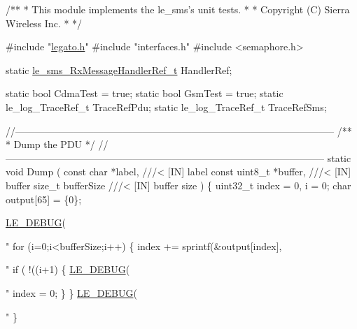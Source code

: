 
\begin{DoxyCodeInclude}
\textcolor{comment}{/**}
\textcolor{comment}{ * This module implements the le\_sms's unit tests.}
\textcolor{comment}{  *}
\textcolor{comment}{  * Copyright (C) Sierra Wireless Inc.}
\textcolor{comment}{  *}
\textcolor{comment}{  */}

\textcolor{preprocessor}{#include "\hyperlink{legato_8h}{legato.h}"}
\textcolor{preprocessor}{#include "interfaces.h"}
\textcolor{preprocessor}{#include <semaphore.h>}

\textcolor{keyword}{static} \hyperlink{le__sms__interface_8h_a77d2607cc541bf0369e69bb2d105d4bf}{le\_sms\_RxMessageHandlerRef\_t} HandlerRef;

\textcolor{keyword}{static} \textcolor{keywordtype}{bool} CdmaTest = \textcolor{keyword}{true};
\textcolor{keyword}{static} \textcolor{keywordtype}{bool} GsmTest = \textcolor{keyword}{true};
\textcolor{keyword}{static} le\_log\_TraceRef\_t TraceRefPdu;
\textcolor{keyword}{static} le\_log\_TraceRef\_t TraceRefSms;

\textcolor{comment}{//--------------------------------------------------------------------------------------------------}\textcolor{comment}{}
\textcolor{comment}{/**}
\textcolor{comment}{ * Dump the PDU}
\textcolor{comment}{ */}
\textcolor{comment}{//--------------------------------------------------------------------------------------------------}
\textcolor{keyword}{static} \textcolor{keywordtype}{void} Dump
(
    \textcolor{keyword}{const} \textcolor{keywordtype}{char}      *label,     \textcolor{comment}{///< [IN] label}
\textcolor{comment}{}    \textcolor{keyword}{const} uint8\_t   *buffer,    \textcolor{comment}{///< [IN] buffer}
\textcolor{comment}{}    \textcolor{keywordtype}{size\_t}           bufferSize \textcolor{comment}{///< [IN] buffer size}
\textcolor{comment}{})
\{
    uint32\_t index = 0, i = 0;
    \textcolor{keywordtype}{char} output[65] = \{0\};

    \hyperlink{le__log_8h_a2a91ea8857cf190fde71d85ba930a498}{LE\_DEBUG}(\textcolor{stringliteral}{"%
    \textcolor{keywordflow}{for} (i=0;i<bufferSize;i++)
    \{
        index += sprintf(&output[index],\textcolor{stringliteral}{"%
        \textcolor{keywordflow}{if} ( !((i+1)%
        \{
            \hyperlink{le__log_8h_a2a91ea8857cf190fde71d85ba930a498}{LE\_DEBUG}(\textcolor{stringliteral}{"%
            index = 0;
        \}
    \}
    \hyperlink{le__log_8h_a2a91ea8857cf190fde71d85ba930a498}{LE\_DEBUG}(\textcolor{stringliteral}{"%
\}

}}}}
\end{DoxyCodeInclude}
